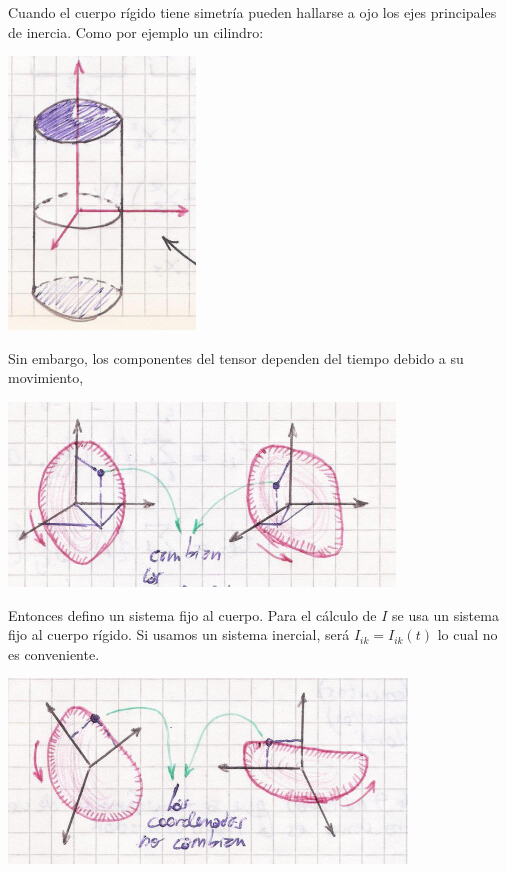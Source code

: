 \documentclass[10pt,oneside]{CBFT_book}
\begin{document}
Cuando el cuerpo rígido tiene simetría pueden hallarse a ojo los ejes principales de inercia.
Como por ejemplo un cilindro:

\includegraphics[scale=0.4]{images/fig_mc_rigid_body_ejesinercia0.jpg}

Sin embargo, los componentes del tensor dependen del tiempo debido a su movimiento,

\includegraphics[scale=0.4]{images/fig_mc_rigid_body_ejesinercia1.jpg}

Entonces defino un sistema fijo al cuerpo. 
Para el cálculo de $I$ se usa un sistema fijo al cuerpo rígido. Si usamos un sistema inercial,
será $I_{ik}=I_{ik}(t)$ lo cual no es conveniente.

\includegraphics[scale=0.4]{images/fig_mc_rigid_body_ejesinercia2.jpg}
\end{document}

